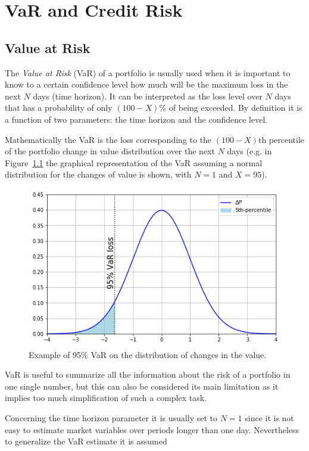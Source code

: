 \chapter{VaR and Credit Risk}\label{var-and-credit-risk}

\section{Value at Risk}\label{value-at-risk}

The \emph{Value at Risk} (VaR) of a portfolio is usually used when it
is important to know to a certain confidence level how
much will be the maximum loss in the next $N$ days (time horizon).
It can be interpreted as the loss level over $N$ days that has a 
probability of only \((100 - X)\%\) of being exceeded.
By definition it is a function of two parameters:
the time horizon and the confidence level. 

Mathematically the VaR is the loss corresponding to the
\((100-X)\textrm{th}\) percentile of the portfolio 
change in value distribution over the next $N$ days 
(e.g. in Figure~\ref{fig:var_loss}
the graphical representation of the VaR assuming a normal
distribution for the changes of value is shown, with $N=1$ and $X=95$).

\begin{figure}[htb]
\centering
  \includegraphics[width=0.6\linewidth]{figures/95_var.png}
  \caption{Example of 95\% VaR on the distribution of changes in the value.}
  \label{fig:var_loss}
\end{figure}
    
VaR is useful to summarize all the information about the risk of a
portfolio in one single number, but this can also be considered its main
limitation as it implies too much simplification of such a complex task.

Concerning the time horizon parameter it is usually set to $N=1$ since
it is not easy to estimate market variables over periods longer than one
day. Nevertheless to generalize the VaR estimate it is assumed

